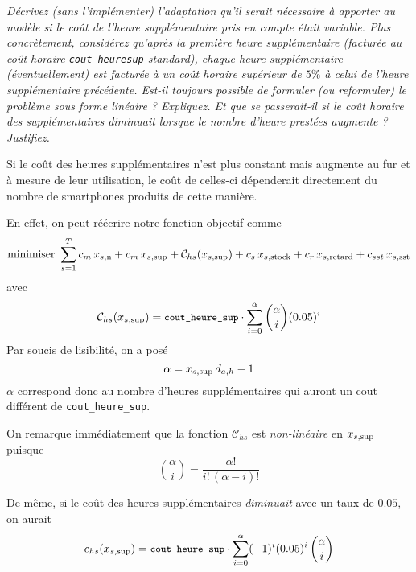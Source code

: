 \question %
\emph{Décrivez (sans l'implémenter) l'adaptation qu'il serait nécessaire à
apporter au modèle si le coût de l'heure supplémentaire pris en compte était
variable. Plus concrètement, considérez qu'après la première heure
supplémentaire (facturée au coût horaire \texttt{cout\textunderscore
heure\textunderscore sup} standard), chaque heure supplémentaire
(éventuellement) est facturée à un coût horaire supérieur de $5 \%$ 
à celui de l'heure supplémentaire précédente. 
Est-il toujours possible de formuler (ou reformuler) 
le problème sous forme linéaire ? Expliquez. 
Et que se passerait-il si le coût horaire des supplémentaires \emph{diminuait}
lorsque le nombre d'heure prestées augmente ? Justifiez.}

Si le coût des heures supplémentaires n'est plus constant mais augmente au fur et à mesure de leur utilisation, 
le coût de celles-ci dépenderait directement du nombre de smartphones 
produits de cette manière.

En effet, on peut réécrire notre fonction objectif comme
\[
  \mbox{minimiser } 
  \sum_{s=1}^{T} 
  c_m\, x_{s,\text{n}} + c_m \, x_{s,\text{sup}} + \mathcal{C}_{hs} (x_{s,\text{sup}})
  + c_s\, x_{s,\text{stock}} + c_r\, x_{s,\text{retard}} + c_{sst}\, x_{s,\text{sst}}
\]
avec
\[
  \mathcal{C}_{hs} (x_{s,\text{sup}}) = {\small\texttt{cout\_heure\_sup}} \cdot
  \sum_{i=0}^{\alpha} \binom{\alpha}{i} (0.05)^{i} 
\]
Par soucis de lisibilité, on a posé
\[ \alpha = x_{s,\text{sup}} \, d_{a,h} - 1 \]
$\alpha$ correspond donc au nombre d'heures supplémentaires qui auront
un cout différent de \texttt{cout\_heure\_sup}.

On remarque immédiatement que la fonction $\mathcal{C}_{hs}$
est \emph{non-linéaire} en $x_{s,\text{sup}}$ puisque 
\[ \binom{\alpha}{i} =\frac{\alpha !}{i!\,(\alpha-i)!} \]

De même, si le coût des heures supplémentaires \emph{diminuait} 
avec un taux de $0.05$,
on aurait
\[
  c_{hs} (x_{s,\text{sup}}) = {\small\texttt{cout\_heure\_sup}} \cdot
  \sum_{i=0}^{\alpha} (-1)^i(0.05)^{i} \,   \binom{\alpha}{i}
\]
